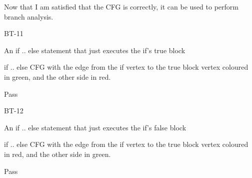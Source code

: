 Now that I am satisfied that the CFG is correctly, it can be used to perform branch analysis.

\begin{minipage}{0.6\textwidth}
\begin{description}[style=sameline,leftmargin=3.5cm,nolistsep]
\item[\hspace*{0.3cm}Label] BT-11
\item[\hspace*{0.3cm}Description] An if .. else statement that just executes the if's true block
\item[\hspace*{0.3cm}Expected Output] if .. else CFG with the edge from the if vertex to the true block vertex coloured in green, and the other side in red.
\item[\hspace*{0.3cm}Result] Pass
\end{description}
\end{minipage}
\begin{minipage}{0.39\textwidth}
\centering
{}
\end{minipage}

\begin{minipage}{0.6\textwidth}
\begin{description}[style=sameline,leftmargin=3.5cm,nolistsep]
\item[\hspace*{0.3cm}Label] BT-12
\item[\hspace*{0.3cm}Description] An if .. else statement that just executes the if's false block
\item[\hspace*{0.3cm}Expected Output] if .. else CFG with the edge from the if vertex to the true block vertex coloured in red, and the other side in green.
\item[\hspace*{0.3cm}Result] Pass
\end{description}
\end{minipage}
\begin{minipage}{0.39\textwidth}
\centering
{}
\end{minipage}

